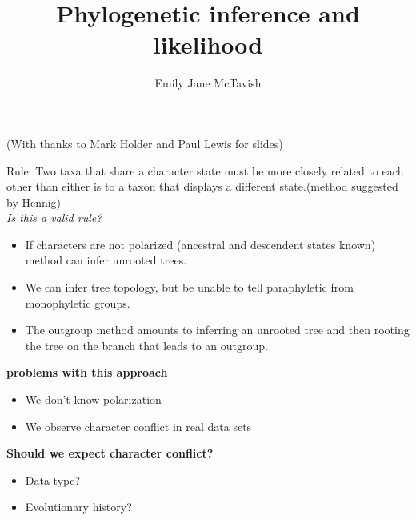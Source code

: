 \documentclass{beamer}
\title[*]{Phylogenetic inference and likelihood}
\author[*]{Emily Jane McTavish}
\institute[*]{
Life and Environmental Sciences\\
University of California, Merced\\
\texttt{ejmctavish@ucmerced.edu, twitter:snacktavish}\\
}
\date{}
\begin{document}
\begin{frame}
\titlepage
(With thanks to Mark Holder and Paul Lewis for slides) 
\end{frame}




\begin{frame}
Rule: Two taxa that share a character state must be more
closely related to each other than either is to a taxon that
displays a different state.(method suggested by Hennig)\\ 
\textit{Is this a valid rule?}
\end{frame}
% 






\begin{frame}
\begin{itemize}
 \item If characters are not polarized (ancestral and descendent states known)
 method can infer unrooted trees.
 \item We can infer tree topology, but be unable to tell paraphyletic from
monophyletic groups.
 \item The outgroup method amounts to inferring an unrooted tree and then
rooting the tree on the branch that leads to an outgroup.
\end{itemize}
\end{frame}




\begin{frame}
\textbf{problems with this approach}
\begin{itemize}
 \item We don't know polarization
 \item We observe character conflict in real data sets
\end{itemize}
\end{frame}






\begin{frame}
\textbf{Should we expect character conflict?}
\begin{itemize}
 \item Data type?
 \item Evolutionary history?
\end{itemize}
\end{frame}
\end{document}
